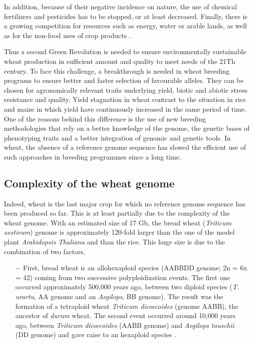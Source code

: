 \documentclass[a4paper, 12pt]{article}
\begin{document}
\begin{onehalfspace}
In addition, because of their negative incidence on nature, the use of chemical fertilizers and pesticides has to be stopped, or at least decreased. Finally, there is a growing competition for resources such as energy, water or arable lands, as well as for the non-food uses of crop products \citep{Godfray2010}. 

Thus a second Green Revolution is needed to ensure environmentally sustainable wheat production in sufficient amount and quality to meet needs of the 21Th century. To face this challenge, a breakthrough is needed in wheat breeding programs to ensure better and faster selection of favourable alleles. They can be chosen for agronomically relevant traits underlying yield, biotic and abiotic stress resistance and quality. Yield stagnation in wheat contrast to the situation in rice and maize in which yield have continuously increased in the same period of time. One of the reasons behind this difference is the use of new breeding methodologies that rely on a better knowledge of the genome, the genetic bases of phenotyping traits and a better integration of genomic and genetic tools. In wheat, the absence of a reference genome sequence has slowed the efficient use of such approaches in breeding programmes since a long time.

        \subsection{Complexity of the wheat genome}
        
Indeed, wheat is the last major crop for which no reference genome sequence has been produced so far. This is at least partially due to the complexity of the wheat genome. With an estimated size of 17 Gb, the bread wheat (\textit{Triticum aestivum}) genome is approximately 120-fold larger than the one of the model plant \textit{Arabidopsis Thaliana} and than the rice. This huge size is due to the combination of two factors. 

\begin{itemize}
\item[$-$] First, bread wheat is an allohexaploid species (AABBDD genome; 2n = 6x = 42) coming from two successive polyploidization events. The first one occurred approximately 500,000 years ago,  between two diploid species (\textit{T. urartu}, AA genome and an \textit{Aegilops}, BB genome). The result was the formation of a tetraploid wheat \textit{Triticum dicoccoides} (genome AABB), the ancestor of \textit{durum} wheat. The second event occurred around 10,000 years ago, between \textit{Triticum dicoccoides} (AABB genome) and \textit{Aegilops tauschii} (DD genome) and gave raise to an hexaploid species \citep{Marcussen2014}. 


\end{itemize}
\end{onehalfspace}
\end{document}
